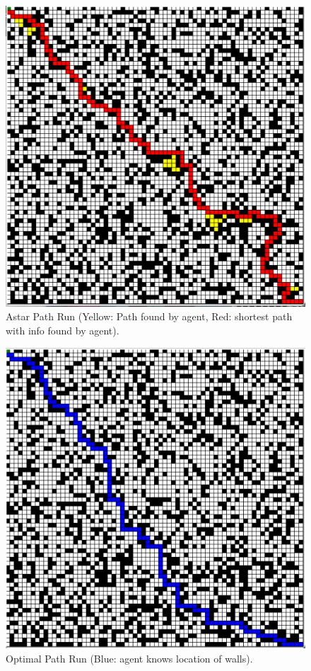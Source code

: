\documentclass{homeworg}
\begin{document}
\newpage
\begin{figure}[h]
  	\centering
  	\includegraphics*[scale=0.3]{Astar1.jpeg}
	\caption{Astar Path Run (Yellow: Path found by agent, Red: shortest path with info found by agent).}
	\label{fig:example}
\end{figure}
 
\begin{figure}[h]
  	\centering
  	\includegraphics*[scale=0.3]{Optimal1.jpeg}
	\caption{Optimal Path Run (Blue: agent knows location of walls).}
	\label{fig:example}
\end{figure}
 
\end{document}

